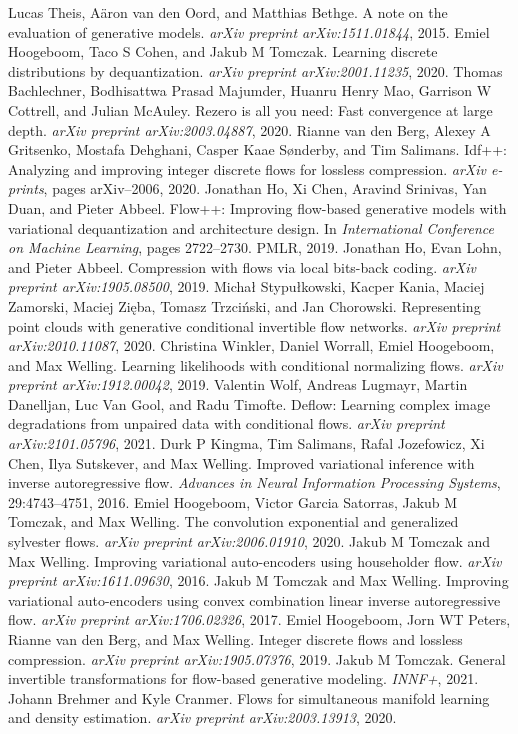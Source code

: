 \begin{chapterreferences}
 Lucas Theis, Aäron van den Oord, and Matthias Bethge. A note on the evaluation of generative models. \emph{arXiv preprint arXiv:1511.01844}, 2015.
 Emiel Hoogeboom, Taco S Cohen, and Jakub M Tomczak. Learning discrete distributions by dequantization. \emph{arXiv preprint arXiv:2001.11235}, 2020.
 Thomas Bachlechner, Bodhisattwa Prasad Majumder, Huanru Henry Mao, Garrison W Cottrell, and Julian McAuley. Rezero is all you need: Fast convergence at large depth. \emph{arXiv preprint arXiv:2003.04887}, 2020.
 Rianne van den Berg, Alexey A Gritsenko, Mostafa Dehghani, Casper Kaae Sønderby, and Tim Salimans. Idf++: Analyzing and improving integer discrete flows for lossless compression. \emph{arXiv e-prints}, pages arXiv--2006, 2020.
 Jonathan Ho, Xi Chen, Aravind Srinivas, Yan Duan, and Pieter Abbeel. Flow++: Improving flow-based generative models with variational dequantization and architecture design. In \emph{International Conference on Machine Learning}, pages 2722--2730. PMLR, 2019.
 Jonathan Ho, Evan Lohn, and Pieter Abbeel. Compression with flows via local bits-back coding. \emph{arXiv preprint arXiv:1905.08500}, 2019.
 Michał Stypułkowski, Kacper Kania, Maciej Zamorski, Maciej Zięba, Tomasz Trzciński, and Jan Chorowski. Representing point clouds with generative conditional invertible flow networks. \emph{arXiv preprint arXiv:2010.11087}, 2020.
 Christina Winkler, Daniel Worrall, Emiel Hoogeboom, and Max Welling. Learning likelihoods with conditional normalizing flows. \emph{arXiv preprint arXiv:1912.00042}, 2019.
 Valentin Wolf, Andreas Lugmayr, Martin Danelljan, Luc Van Gool, and Radu Timofte. Deflow: Learning complex image degradations from unpaired data with conditional flows. \emph{arXiv preprint arXiv:2101.05796}, 2021.
 Durk P Kingma, Tim Salimans, Rafal Jozefowicz, Xi Chen, Ilya Sutskever, and Max Welling. Improved variational inference with inverse autoregressive flow. \emph{Advances in Neural Information Processing Systems}, 29:4743--4751, 2016.
 Emiel Hoogeboom, Victor Garcia Satorras, Jakub M Tomczak, and Max Welling. The convolution exponential and generalized sylvester flows. \emph{arXiv preprint arXiv:2006.01910}, 2020.
 Jakub M Tomczak and Max Welling. Improving variational auto-encoders using householder flow. \emph{arXiv preprint arXiv:1611.09630}, 2016.
 Jakub M Tomczak and Max Welling. Improving variational auto-encoders using convex combination linear inverse autoregressive flow. \emph{arXiv preprint arXiv:1706.02326}, 2017.
 Emiel Hoogeboom, Jorn WT Peters, Rianne van den Berg, and Max Welling. Integer discrete flows and lossless compression. \emph{arXiv preprint arXiv:1905.07376}, 2019.
 Jakub M Tomczak. General invertible transformations for flow-based generative modeling. \emph{INNF+}, 2021.
 Johann Brehmer and Kyle Cranmer. Flows for simultaneous manifold learning and density estimation. \emph{arXiv preprint arXiv:2003.13913}, 2020.


\end{chapterreferences}
